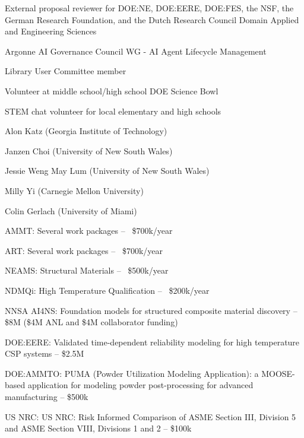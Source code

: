External proposal reviewer  for DOE:NE, DOE:EERE, DOE:FES, the NSF, the German Research Foundation, and the Dutch Research Council Domain Applied and Engineering Sciences


Argonne AI Governance Council WG - AI Agent Lifecycle Management 

Library User Committee member 

Volunteer at middle school/high school DOE Science Bowl 

STEM chat volunteer for local elementary and high schools 


Alon Katz (Georgia Institute of Technology)  

Janzen Choi (University of New South Wales) 

Jessie Weng May Lum (University of New South Wales) 

Milly Yi (Carnegie Mellon University) 

Colin Gerlach (University of Miami) 


AMMT: Several work packages -- ~\$700k/year 

ART: Several work packages -- ~\$700k/year 

NEAMS: Structural Materials -- ~\$500k/year 

NDMQi: High Temperature Qualification -- ~\$200k/year 


NNSA  AI4NS: Foundation models for structured composite material discovery -- \$8M (\$4M ANL and \$4M collaborator funding)

DOE:EERE:  Validated time-dependent reliability modeling for high temperature CSP systems -- \$2.5M 

DOE:AMMTO:  PUMA (Powder Utilization Modeling Application): a MOOSE-based application for modeling powder post-processing for advanced manufacturing -- \$500k 

US NRC:  US NRC: Risk Informed Comparison of ASME Section III, Division 5 and ASME Section VIII, Divisions 1 and 2 -- \$100k

